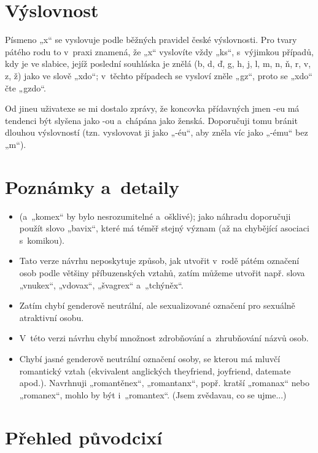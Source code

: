 \section{Výslovnost}
%
Písmeno „x“ se vyslovuje podle běžných pravidel české výslovnosti.
Pro tvary pátého rodu to v praxi znamená, že „x“ vyslovíte vždy „ks“,
s výjimkou případů, kdy je ve slabice, jejíž poslední souhláska je znělá
(b, d, ď, g, h, j, l, m, n, ň, r, v, z, ž) jako ve slově „xdo“;
v těchto případech se vysloví zněle „gz“, proto se „xdo“ čte „gzdo“.

Od jineu uživatexe se mi dostalo zprávy, že koncovka přídavných jmen
-eu má tendenci být slyšena jako -ou a chápána jako ženská. Doporučuji
tomu bránit dlouhou výslovností (tzn. vyslovovat ji jako „-éu“, aby zněla
víc jako „-ému“ bez „m“).

\section{Poznámky a detaily}
\begin{itemize}
\item{} (a „komex“ by bylo nesrozumitelné a ošklivé);
jako náhradu doporučuji použít slovo „bavix“, které má téměř stejný význam (až na chybějící asociaci s komikou).
\item Tato verze návrhu neposkytuje způsob, jak utvořit v rodě pátém označení osob podle většiny příbuzenských vztahů, zatím můžeme utvořit např. slova „vnukex“, „vdovax“, „švagrex“ a „tchýněx“.
\item Zatím chybí genderově neutrální, ale sexualizované označení pro sexuálně atraktivní osobu.
\item V této verzi návrhu chybí množnost zdrobňování a zhrubňování názvů osob.
\item Chybí jasné genderově neutrální označení osoby, se kterou má mluvčí romantický vztah (ekvivalent anglických they\-friend, joy\-friend, date\-mate apod.). Navrhnuji „romantěnex“, „romantanx“, popř. kratší „romanax“ nebo „romanex“, mohlo by být i „romantex“. (Jsem zvědavau, co se ujme...)
\end{itemize}

\section{Přehled původcixí}

